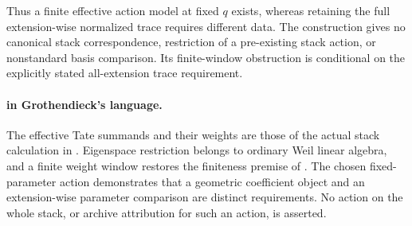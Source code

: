 Thus a finite effective action model at fixed $q$ exists,
whereas retaining the full extension-wise normalized trace
requires different data. The construction gives no canonical
stack correspondence, restriction of a pre-existing stack
action, or nonstandard basis comparison. Its finite-window
obstruction is conditional on the explicitly stated
all-extension trace requirement.

\paragraph{ in Grothendieck's language.}
The effective Tate summands and their weights are those of the
actual stack calculation in . Eigenspace restriction
belongs to ordinary Weil linear algebra, and a finite weight
window restores the finiteness premise of .
The chosen fixed-parameter action demonstrates that a geometric
coefficient object and an extension-wise parameter comparison
are distinct requirements. No action on the whole stack, or
archive attribution for such an action, is asserted.
